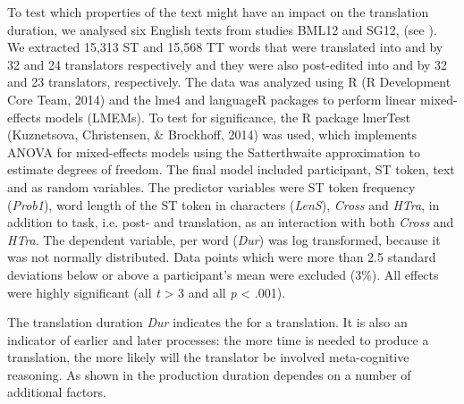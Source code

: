 \documentclass[output=paper]{LSP/langsci}
\begin{document}
To test which properties of the text might have an impact on the translation duration, we analysed six English texts from studies BML12 and SG12, (see ). We extracted 15,313 ST and 15,568 TT words that were translated into  and  by 32 and 24 translators respectively and they were also post-edited into  and  by 32 and 23 translators, respectively. The data was analyzed using R (R Development Core Team, 2014) and the lme4 \citep{Bates2014} and languageR \citep{Baayen2013} packages to perform linear mixed-effects models (LMEMs). To test for significance, the R package lmerTest (Kuznetsova, Christensen, \& Brockhoff, 2014) was used, which implements ANOVA for mixed-effects models using the Satterthwaite approximation to estimate degrees of freedom. The final model included participant, ST token, text and  as random variables. The predictor variables were ST token frequency (\textit{Prob1}), word length of the ST token in characters (\textit{LenS}), \textit{Cross} and \textit{HTra}, in addition to task, i.e. post- and translation, as an interaction with both \textit{Cross} and \textit{HTra}. The dependent variable,  per word (\textit{Dur}) was log transformed, because it was not normally distributed. Data points which were more than 2.5 standard deviations below or above a participant's mean were excluded (3\%). All effects were highly significant (all \textit{t} {\textgreater} 3 and all \textit{p} {\textless} .001).

 
The translation duration \textit{Dur} indicates the  for a translation. It is also an indicator of earlier and later processes: the more time is needed to produce a translation, the more likely will the translator be involved meta-cognitive reasoning. As shown in  the production duration dependes on a number of additional factors.
\end{document}
